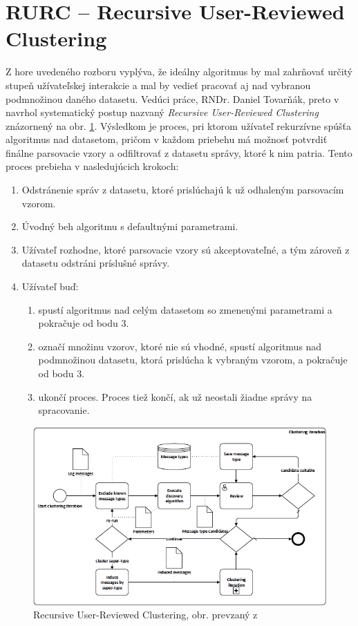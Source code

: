 \section{RURC -- Recursive User-Reviewed Clustering}
Z hore uvedeného rozboru vyplýva, že ideálny algoritmus by mal zahrňovať určitý stupeň užívateľskej interakcie a mal by vedieť pracovať aj nad vybranou podmnožinou daného datasetu. Vedúci práce, RNDr. Daniel Tovarňák, preto v \parencite{Tovarnak2017} navrhol systematický postup nazvaný \emph{Recursive User-Reviewed Clustering} znázornený na obr. \ref{fig:rurc}. Výsledkom je proces, pri ktorom užívateľ rekurzívne spúšťa algoritmus nad datasetom, pričom v každom priebehu má možnosť potvrdiť finálne parsovacie vzory a odfiltrovať z datasetu správy, ktoré k nim patria. Tento proces prebieha v nasledujúcich krokoch:

\begin{enumerate}
  \item Odstránenie správ z datasetu, ktoré prislúchajú k už odhaleným parsovacím vzorom.
  \item Úvodný beh algoritmu s defaultnými parametrami.
  \item Užívateľ rozhodne, ktoré parsovacie vzory sú akceptovateľné, a tým zároveň z datasetu odstráni príslušné správy.
  \item Užívateľ buď:
  	\begin{enumerate}
   		 \item spustí algoritmus nad celým datasetom so zmenenými parametrami a pokračuje od bodu 3.
   		 \item označí množinu vzorov, ktoré nie sú vhodné, spustí algoritmus nad podmnožinou datasetu, ktorá prislúcha k vybraným vzorom, a 				pokračuje od bodu 3.
   		 \item ukončí proces. Proces tiež končí, ak už neostali žiadne správy na spracovanie.
 	 \end{enumerate}
\end{enumerate}

\begin{figure}[htbp]
 \centering 
 \begin{minipage}{0.95\linewidth}
 	\centering
 	\includegraphics[width=\textwidth]{images/RURC.png} 	
 \end{minipage}
  \caption{Recursive User-Reviewed Clustering, obr. prevzaný z  \parencite{Tovarnak2017}}
  \label{fig:rurc}
\end{figure}


